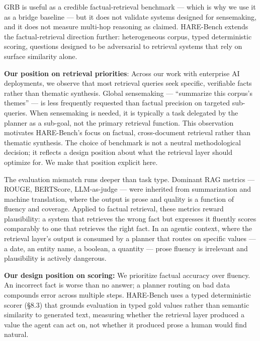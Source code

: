 GRB is useful as a credible factual-retrieval benchmark --- which is why we use it as a bridge baseline --- but it does not validate systems designed for sensemaking, and it does not measure multi-hop reasoning as claimed. HARE-Bench extends the factual-retrieval direction further: heterogeneous corpus, typed deterministic scoring, questions designed to be adversarial to retrieval systems that rely on surface similarity alone.

\textbf{Our position on retrieval priorities}: Across our work with enterprise AI deployments, we observe that most retrieval queries seek specific, verifiable facts rather than thematic synthesis. Global sensemaking --- ``summarize this corpus's themes'' --- is less frequently requested than factual precision on targeted sub-queries. When sensemaking is needed, it is typically a task delegated by the planner as a sub-goal, not the primary retrieval function. This observation motivates HARE-Bench's focus on factual, cross-document retrieval rather than thematic synthesis. The choice of benchmark is not a neutral methodological decision; it reflects a design position about what the retrieval layer should optimize for. We make that position explicit here.

The evaluation mismatch runs deeper than task type. Dominant RAG metrics --- ROUGE, BERTScore, LLM-as-judge --- were inherited from summarization and machine translation, where the output is prose and quality is a function of fluency and coverage. Applied to factual retrieval, these metrics reward plausibility: a system that retrieves the wrong fact but expresses it fluently scores comparably to one that retrieves the right fact. In an agentic context, where the retrieval layer's output is consumed by a planner that routes on specific values --- a date, an entity name, a boolean, a quantity --- prose fluency is irrelevant and plausibility is actively dangerous.

\textbf{Our design position on scoring:} We prioritize factual accuracy over fluency. An incorrect fact is worse than no answer; a planner routing on bad data compounds error across multiple steps. HARE-Bench uses a typed deterministic scorer (§8.3) that grounds evaluation in typed gold values rather than semantic similarity to generated text, measuring whether the retrieval layer produced a value the agent can act on, not whether it produced prose a human would find natural.

